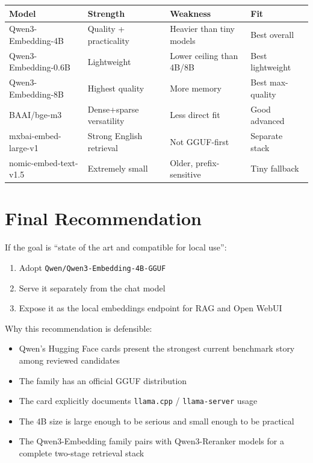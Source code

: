 \begin{center}
\begin{tabular}{llll}
\toprule
\textbf{Model} & \textbf{Strength} & \textbf{Weakness} & \textbf{Fit} \\
\midrule
Qwen3-Embedding-4B & Quality + practicality & Heavier than tiny models & Best overall \\
Qwen3-Embedding-0.6B & Lightweight & Lower ceiling than 4B/8B & Best lightweight \\
Qwen3-Embedding-8B & Highest quality & More memory & Best max-quality \\
BAAI/bge-m3 & Dense+sparse versatility & Less direct fit & Good advanced \\
mxbai-embed-large-v1 & Strong English retrieval & Not GGUF-first & Separate stack \\
nomic-embed-text-v1.5 & Extremely small & Older, prefix-sensitive & Tiny fallback \\
\bottomrule
\end{tabular}
\end{center}

\section{Final Recommendation}

If the goal is ``state of the art and compatible for local use'':

\begin{enumerate}
    \item Adopt \texttt{Qwen/Qwen3-Embedding-4B-GGUF}
    \item Serve it separately from the chat model
    \item Expose it as the local embeddings endpoint for RAG and Open WebUI
\end{enumerate}

Why this recommendation is defensible:

\begin{itemize}
    \item Qwen's Hugging Face cards present the strongest current benchmark story among
          reviewed candidates
    \item The family has an official GGUF distribution
    \item The card explicitly documents \texttt{llama.cpp} / \texttt{llama-server} usage
    \item The 4B size is large enough to be serious and small enough to be practical
    \item The Qwen3-Embedding family pairs with Qwen3-Reranker models for a complete
          two-stage retrieval stack
\end{itemize}


